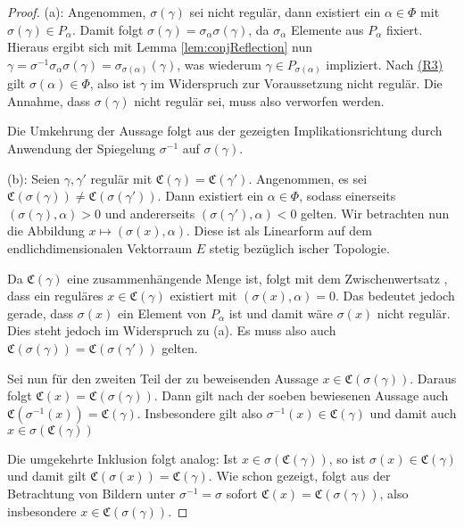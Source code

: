 \begin{proof}
  (a): 
  Angenommen, $\sigma(\gamma)$ sei nicht regulär, dann existiert ein $\alpha \in \Phi$ mit $\sigma(\gamma) \in P_\alpha$.
  Damit folgt $\sigma(\gamma) = \sigma_\alpha \sigma(\gamma)$, da $\sigma_\alpha$ Elemente aus $P_\alpha$ fixiert.
  Hieraus ergibt sich mit Lemma \ref{lem:conjReflection} nun $\gamma = \sigma^{-1} \sigma_\alpha \sigma(\gamma) = \sigma_{\sigma(\alpha)}(\gamma)$, was wiederum $\gamma \in P_{\sigma(\alpha)}$ impliziert.
  Nach \hyperref[it:R3]{(R3)} gilt $\sigma(\alpha) \in \Phi$, also ist $\gamma$ im Widerspruch zur Voraussetzung nicht regulär.
  Die Annahme, dass $\sigma(\gamma)$ nicht regulär sei, muss also verworfen werden.
  
  Die Umkehrung der Aussage folgt aus der gezeigten Implikationsrichtung durch Anwendung der Spiegelung $\sigma^{-1}$ auf $\sigma(\gamma)$.

  (b): 
  Seien $\gamma, \gamma'$ regulär mit $\mathfrak{C}(\gamma) = \mathfrak{C}(\gamma')$.
  Angenommen, es sei $\mathfrak{C}(\sigma(\gamma)) \neq \mathfrak{C}(\sigma(\gamma'))$.
  Dann existiert ein $\alpha \in \Phi$, sodass einerseits $(\sigma(\gamma), \alpha) > 0$ und andererseits $(\sigma(\gamma'), \alpha) < 0$ gelten.
  Wir betrachten nun die Abbildung $x \mapsto  (\sigma(x), \alpha)$.
  Diese ist als Linearform auf dem endlichdimensionalen Vektorraum $E$ stetig bezüglich \euklid ischer Topologie.

  Da $\mathfrak{C}(\gamma)$ eine zusammenhängende Menge ist, folgt mit dem Zwischenwertsatz \cite[S.232]{bartsch2015allgemeine}, dass ein reguläres $x \in \mathfrak{C}(\gamma)$ existiert mit $(\sigma(x), \alpha) = 0$.
  Das bedeutet jedoch gerade, dass $\sigma(x)$ ein Element von $P_\alpha$ ist und damit wäre $\sigma(x)$ nicht regulär.
  Dies steht jedoch im Widerspruch zu (a). 
  Es muss also auch $\mathfrak{C}(\sigma(\gamma)) = \mathfrak{C}(\sigma(\gamma'))$ gelten.
  
  Sei nun für den zweiten Teil der zu beweisenden Aussage $x \in \mathfrak{C}(\sigma(\gamma))$.
  Daraus folgt $\mathfrak{C}(x) = \mathfrak{C}(\sigma(\gamma))$.
  Dann gilt nach der soeben bewiesenen Aussage auch $\mathfrak{C}(\sigma^{-1}(x)) = \mathfrak{C}(\gamma)$.
  Insbesondere gilt also $\sigma^{-1}(x) \in \mathfrak{C}(\gamma)$ und damit auch $x \in \sigma(\mathfrak{C}(\gamma))$
  
  Die umgekehrte Inklusion folgt analog: Ist $x \in \sigma(\mathfrak{C}(\gamma))$, so ist $\sigma(x) \in \mathfrak{C}(\gamma)$ und damit gilt $\mathfrak{C}(\sigma(x)) = \mathfrak{C}(\gamma)$. 
  Wie schon gezeigt, folgt aus der Betrachtung von Bildern unter $\sigma^{-1} = \sigma$ sofort $\mathfrak{C}(x) = \mathfrak{C}(\sigma(\gamma))$, also insbesondere $x \in \mathfrak{C}(\sigma(\gamma))$.


\end{proof}
